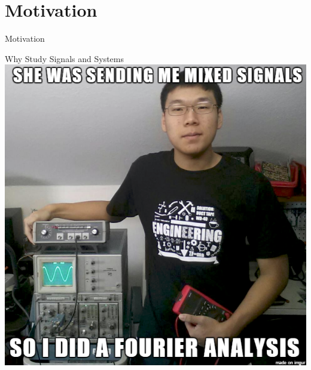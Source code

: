 \documentclass[aspectratio=169,xcolor=dvipsnames,svgnames,x11names,fleqn]{beamer}
\begin{document}
\section{Motivation}


\begin{frame}{}
    \begin{center}
    \Huge \bf \color{DarkBlue}
    \faFire
    
    Motivation
\end{center}
\end{frame}


\begin{frame}{Why Study Signals and Systems}
\centering
    \includegraphics[width=0.4\linewidth]{figures/motivation.png}
\end{frame}
\end{document}
